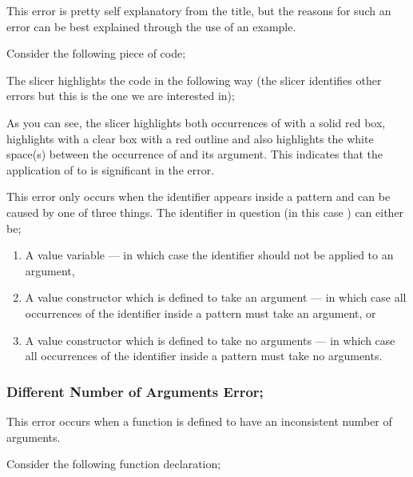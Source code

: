 \documentclass{report}
\begin{document}
\begin{itemize}
\subitem This error is pretty self explanatory from the title, but the
reasons for such an error can be best explained through the use of an
example.

Consider the following piece of code;


The slicer highlights the code in the following way (the slicer
identifies other errors but this is the one we are interested in);


As you can see, the slicer highlights both occurrences of
 with a solid red box, highlights
 with a clear box with a red outline and also
highlights the white space(s) between the occurrence of
 and its argument. This indicates
that the application of  to  is
significant in the error.

This error only occurs when the identifier appears inside a pattern
and can be caused by one of three things. The identifier in
question (in this case ) can either be;

\begin{enumerate}
\item A value variable --- in which case the identifier should not be
  applied to an argument,
\item A value constructor which is defined to take an argument --- in
  which case all occurrences of the identifier inside a pattern must take
  an argument, or
\item A value constructor which is defined to take no arguments --- in
  which case all occurrences of the identifier inside a pattern must take no arguments.
\end{enumerate}

\newpage

\subsubsection{Different Number of Arguments Error;}

\subitem This error occurs when a function is defined to have an
inconsistent number of arguments.

Consider the following function declaration;



\end{itemize}
\end{document}
